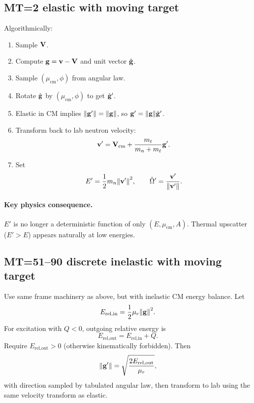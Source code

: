 \documentclass[11pt]{article}
\begin{document}
\subsection{MT=2 elastic with moving target}
Algorithmically:
\begin{enumerate}
  \item Sample $\vb{V}$.
  \item Compute $\vb{g}=\vb{v}-\vb{V}$ and unit vector $\hat{\vb{g}}$.
  \item Sample $(\mu_{\text{cm}},\phi)$ from angular law.
  \item Rotate $\hat{\vb{g}}$ by $(\mu_{\text{cm}},\phi)$ to get $\hat{\vb{g}}'$.
  \item Elastic in CM implies $\norm{\vb{g}'}=\norm{\vb{g}}$, so $\vb{g}'=\norm{\vb{g}}\hat{\vb{g}}'$.
  \item Transform back to lab neutron velocity:
  \begin{equation}
    \vb{v}' = \vb{V}_{\text{cm}} + \frac{m_t}{m_n+m_t}\vb{g}'.
  \end{equation}
  \item Set
  \begin{equation}
    E' = \frac{1}{2}m_n\norm{\vb{v}'}^2,\qquad \hat{\Omega}'=\frac{\vb{v}'}{\norm{\vb{v}'}}.
  \end{equation}
\end{enumerate}

\paragraph{Key physics consequence.}
$E'$ is no longer a deterministic function of only $(E,\mu_{\text{cm}},A)$. Thermal upscatter ($E'>E$) appears naturally at low energies.

\subsection{MT=51--90 discrete inelastic with moving target}
Use same frame machinery as above, but with inelastic CM energy balance. Let
\begin{equation}
  E_{\text{rel,in}} = \frac{1}{2}\mu_r\norm{\vb{g}}^2.
\end{equation}
For excitation with $Q<0$, outgoing relative energy is
\begin{equation}
  E_{\text{rel,out}} = E_{\text{rel,in}} + Q.
\end{equation}
Require $E_{\text{rel,out}}>0$ (otherwise kinematically forbidden). Then
\begin{equation}
  \norm{\vb{g}'} = \sqrt{\frac{2E_{\text{rel,out}}}{\mu_r}},
\end{equation}
with direction sampled by tabulated angular law, then transform to lab using the same velocity transform as elastic.
\end{document}
